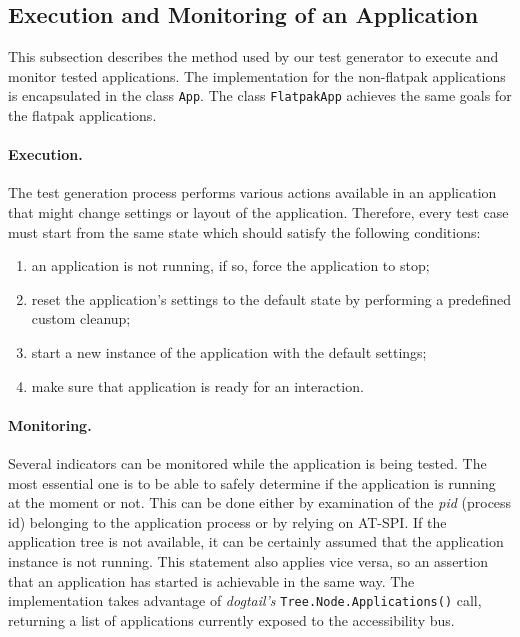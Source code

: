 \subsection{Execution and Monitoring of an Application}\label{monitoring}

This subsection describes the method used by our test generator to execute and monitor tested applications. The implementation for the non-flatpak applications is encapsulated in the class \texttt{App}. The class \texttt{FlatpakApp} achieves the same goals for the flatpak applications.

\paragraph{Execution.} The test generation process performs various actions available in an application that might change settings or layout of the application. Therefore, every test case must start from the same state which should satisfy the following conditions: 
\begin{enumerate}
    \item an application is not running, if so, force the application to stop;
    \item reset the application's settings to the default state by performing a predefined custom cleanup;
    \item start a new instance of the application with the default settings;
    \item make sure that application is ready for an interaction.
\end{enumerate}

\paragraph{Monitoring.} Several indicators can be monitored while the application is being tested. The most essential one is to be able to safely determine if the application is running at the moment or not. This can be done either by examination of the \textit{pid} (process id) belonging to the application process or by relying on AT-SPI. If the application tree is not available, it can be certainly assumed that the application instance is not running. This statement also applies vice versa, so an assertion that an application has started is achievable in the same way. The implementation takes advantage of \textit{dogtail's} \texttt{Tree.Node.Applications()} call, returning a list of applications currently exposed to the accessibility bus.

